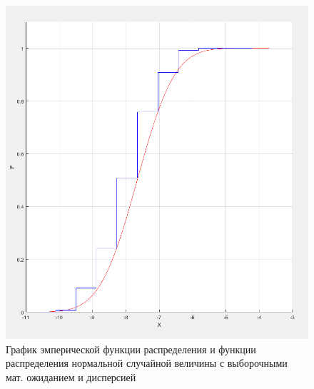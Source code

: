 \documentclass[12pt]{report}
\begin{document}
\newpage

\begin{figure}[h!]
	\centering
	\includegraphics[width=\textwidth]{img/cdf}
	\caption{График эмперической функции распределения и функции распределения нормальной случайной величины с выборочными мат. ожиданием и дисперсией}
\end{figure}



	
\end{document}
